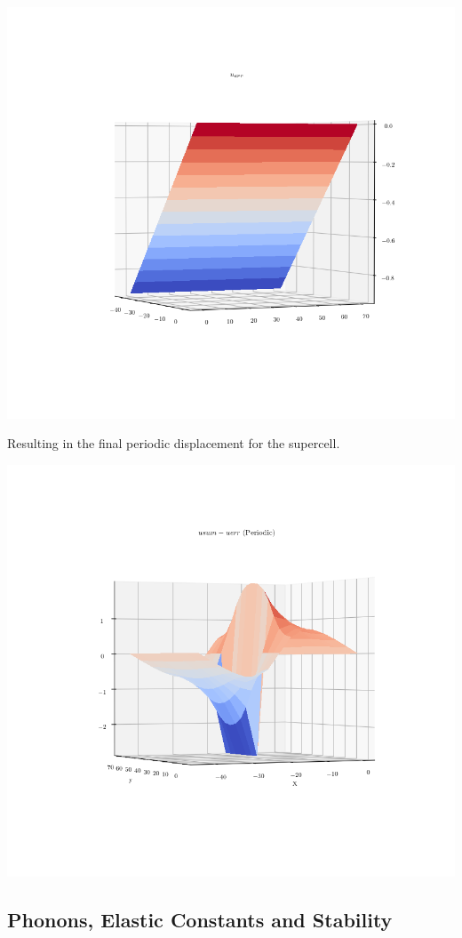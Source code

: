 \documentclass[11pt]{article}
\begin{document}
\begin{enumerate}
\begin{center}
\includegraphics[width=.9\linewidth]{Images/u_err_dipole_O_arrangement.png}
\end{center}
Resulting in the final periodic displacement for the supercell. 
\begin{center}
\includegraphics[width=.9\linewidth]{Images/u_dipole_O_arrangement_periodic_displacement.png}
\end{center}
\end{enumerate}

\subsection{Phonons, Elastic Constants and Stability}
\label{sec:org9d8e8be}
\end{document}
